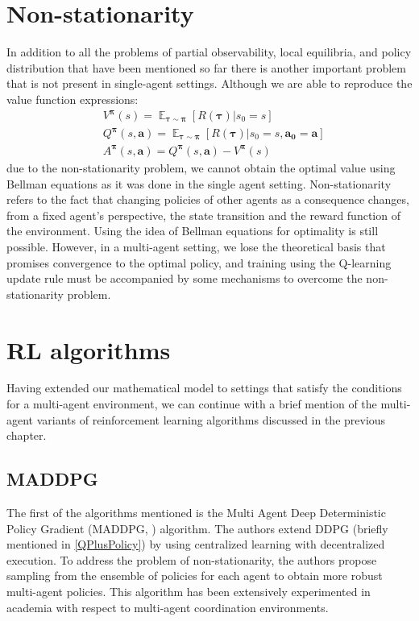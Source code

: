 \section{Non-stationarity}
In addition to all the problems of partial observability, local equilibria, and policy distribution that have been mentioned so far
there is another important problem that is not present in single-agent settings.
Although we are able to reproduce the value function expressions:
\begin{align*}  
    &V^{\boldsymbol{\pi}}(s) = \mathop{\mathbb{E}}_{\boldsymbol{\tau} \sim \boldsymbol{\pi}}[R(\boldsymbol{\tau})|s_0=s] \\
    &Q^{\boldsymbol{\pi}}(s,\boldsymbol{a}) = \mathop{\mathbb{E}}_{\boldsymbol{\tau} \sim \boldsymbol{\pi}}[R(\boldsymbol{\tau})|s_0=s,\boldsymbol{a_0}=\boldsymbol{a}] \\ 
    &A^{\boldsymbol{\pi}}(s,\boldsymbol{a}) = Q^{\boldsymbol{\pi}}(s,\boldsymbol{a}) - V^{\boldsymbol{\pi}}(s)
\end{align*}
due to the non-stationarity problem, we cannot obtain the optimal value using Bellman equations as it was done in the single agent setting.
Non-stationarity refers to the fact that changing policies of other agents as a consequence changes, from a fixed agent's perspective, the state transition and the reward function of the environment. 
Using the idea of Bellman equations for optimality is still possible.
However, in a multi-agent setting, we lose the theoretical basis that promises convergence to the optimal policy, and training using the Q-learning update rule must be accompanied by some mechanisms to overcome the non-stationarity problem.

\section{RL algorithms}
Having extended our mathematical model to settings that satisfy the conditions for a multi-agent environment, we can continue with a brief mention of the multi-agent variants of reinforcement learning algorithms discussed in the previous chapter.
\subsection*{MADDPG}
The first of the algorithms mentioned is the Multi Agent Deep Deterministic Policy Gradient (MADDPG, \cite{MADDPG}) algorithm.
The authors extend DDPG (briefly mentioned in \ref{QPlusPolicy}) by using centralized learning with decentralized execution.
To address the problem of non-stationarity, the authors propose sampling from the ensemble of policies for each agent to obtain more robust multi-agent policies.
This algorithm has been extensively experimented in academia with respect to multi-agent coordination environments.
